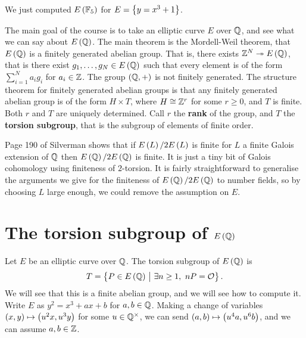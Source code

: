 \begin{example*}
We just computed $ E\br{\FF_5} $ for $ E = \cbr{y = x^3 + 1} $.
\end{example*}

The main goal of the course is to take an elliptic curve $ E $ over $ \mathbb{Q} $, and see what we can say about $ E\br{\QQ} $. The main theorem is the Mordell-Weil theorem, that $ E\br{\QQ} $ is a finitely generated abelian group. That is, there exists $ \ZZ^N \twoheadrightarrow E\br{\QQ} $, that is there exist $ g_1, \dots, g_N \in E\br{\QQ} $ such that every element is of the form $ \sum_{i = 1}^N a_ig_i $ for $ a_i \in \mathbb{Z} $. The group $ \br{\QQ, +} $ is not finitely generated. The structure theorem for finitely generated abelian groups is that any finitely generated abelian group is of the form $ H \times T $, where $ H \cong \mathbb{Z}^r $ for some $ r \ge 0 $, and $ T $ is finite. Both $ r $ and $ T $ are uniquely determined. Call $ r $ the \textbf{rank} of the group, and $ T $ the \textbf{torsion subgroup}, that is the subgroup of elements of finite order.

\begin{remark}
Page 190 of Silverman shows that if $ E\br{L} / 2E\br{L} $ is finite for $ L $ a finite Galois extension of $ \mathbb{Q} $ then $ E\br{\QQ} / 2E\br{\QQ} $ is finite. It is just a tiny bit of Galois cohomology using finiteness of $ 2 $-torsion. It is fairly straightforward to generalise the arguments we give for the finiteness of $ E\br{\QQ} / 2E\br{\QQ} $ to number fields, so by choosing $ L $ large enough, we could remove the assumption on $ E $.
\end{remark}

\pagebreak

\section{The torsion subgroup of \texorpdfstring{$ E\br{\QQ} $}{E(Q)}}


Let $ E $ be an elliptic curve over $ \mathbb{Q} $. The torsion subgroup of $ E\br{\QQ} $ is
$$ T = \cbr{P \in E\br{\QQ} \st \exists n \ge 1, \ nP = \OOO}. $$
We will see that this is a finite abelian group, and we will see how to compute it. Write $ E $ as $ y^2 = x^3 + ax + b $ for $ a, b \in \mathbb{Q} $. Making a change of variables $ \br{x, y} \mapsto \br{u^2x, u^3y} $ for some $ u \in \mathbb{Q}^\times $, we can send $ \br{a, b} \mapsto \br{u^4a, u^6b} $, and we can assume $ a, b \in \mathbb{Z} $.

